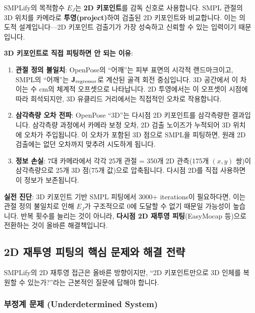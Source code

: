 \documentclass[11pt, a4paper]{report}
\begin{document}
\begin{importantnote}[title={SMPLify의 설계 원리: 왜 2D 키포인트인가}]
SMPLify의 목적함수 $E_J$는 \textbf{2D 키포인트}를 감독 신호로 사용합니다.
SMPL 관절의 3D 위치를 카메라로 \textbf{투영(project)}하여 검출된 2D 키포인트와 비교합니다.
이는 의도적 설계입니다---2D 키포인트 검출기가 가장 성숙하고 신뢰할 수 있는 입력이기 때문입니다.

\textbf{3D 키포인트로 직접 피팅하면 안 되는 이유}:
\begin{enumerate}[leftmargin=*]
  \item \textbf{관절 정의 불일치}: OpenPose의 ``어깨''는 피부 표면의 시각적 랜드마크이고,
  SMPL의 ``어깨''는 $\mathbf{J}_{\text{regressor}}$로 계산된 골격 회전 중심입니다.
  3D 공간에서 이 차이는 수 cm의 체계적 오프셋으로 나타납니다.
  2D 투영에서는 이 오프셋이 시점에 따라 희석되지만,
  3D 유클리드 거리에서는 직접적인 오차로 작용합니다.

  \item \textbf{삼각측량 오차 전파}: OpenPose ``3D''는 다시점 2D 키포인트를 삼각측량한 결과입니다.
  삼각측량 과정에서 카메라 보정 오차, 2D 검출 노이즈가 누적되어 3D 위치에 오차가 주입됩니다.
  이 오차가 포함된 3D 점으로 SMPL을 피팅하면, 원래 2D 검출에는 없던 오차까지 맞추려 시도하게 됩니다.

  \item \textbf{정보 손실}: 7대 카메라에서 각각 25개 관절 = 350개 2D 관측(175개 $(x,y)$ 쌍)이
  삼각측량으로 25개 3D 점(75개 값)으로 압축됩니다. 다시점 2D를 직접 사용하면
  이 정보가 보존됩니다.
\end{enumerate}

\textbf{실전 진단}: 3D 키포인트 기반 SMPL 피팅에서 3000+ iterations이 필요하다면,
이는 관절 정의 불일치로 인해 $E_J$가 구조적으로 0에 도달할 수 없기 때문일 가능성이 높습니다.
반복 횟수를 늘리는 것이 아니라, \textbf{다시점 2D 재투영 피팅}(EasyMocap 등)으로 전환하는 것이
올바른 해결책입니다.
\end{importantnote}


\subsection{2D 재투영 피팅의 핵심 문제와 해결 전략}
\label{sec:fitting_challenges}

SMPLify의 2D 재투영 접근은 올바른 방향이지만, ``2D 키포인트만으로 3D 인체를 복원할 수 있는가?''라는
근본적인 질문에 답해야 합니다.

\subsubsection{부정계 문제 (Underdetermined System)}
\end{document}
